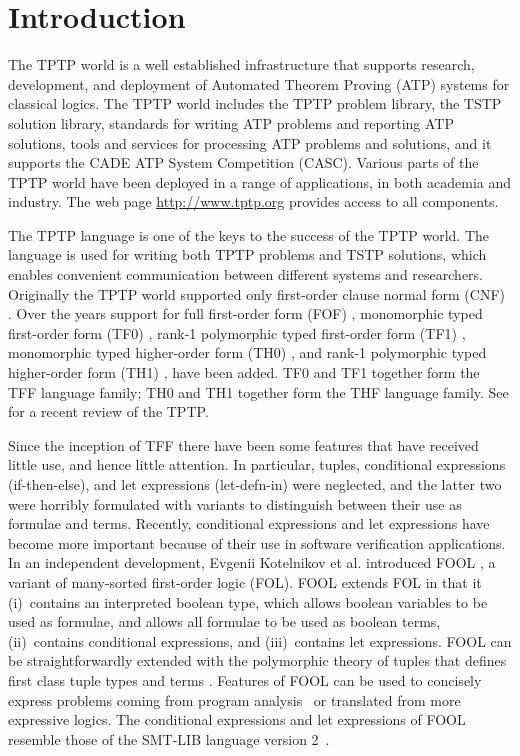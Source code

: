 \section{Introduction}
\label{sec:tfx/Introduction}

The TPTP world \cite{Sut10} is a well established infrastructure that supports
research, development, and deployment of Automated Theorem Proving (ATP)
systems for classical logics.
The TPTP world includes the TPTP problem library,
the TSTP solution library,
standards for writing ATP problems and reporting ATP solutions,
tools and services for processing ATP problems and solutions,
and it supports the CADE ATP System Competition (CASC).
Various parts of the TPTP world have been deployed in a range of applications,
in both academia and industry.
The web page \url{http://www.tptp.org} provides access to all components.

The TPTP language is one of the keys to the success of the TPTP world.
The language is used for writing both TPTP problems and TSTP solutions,
which enables convenient communication between different systems and
researchers.
Originally the TPTP world supported only first-order clause normal form (CNF)
\cite{SS98-JAR}.
Over the years support for full first-order form (FOF) \cite{Sut09},
monomorphic typed first-order form (TF0) \cite{tff0}, rank-1 polymorphic
typed first-order form (TF1) \cite{tff1}, monomorphic typed higher-order 
form (TH0) \cite{THF}, and rank-1 polymorphic typed higher-order form (TH1) 
\cite{KSR16}, have been added.
TF0 and TF1 together form the TFF language family; TH0 and TH1 together form 
the THF language family.
See \cite{Sut17} for a recent review of the TPTP.

Since the inception of TFF there have been some features that have 
received little use, and hence little attention. 
In particular, tuples, conditional expressions (if-then-else), and let 
expressions (let-defn-in) were neglected, and the latter two were horribly 
formulated with variants to distinguish between their use as formulae and 
terms. 
Recently, conditional expressions and let expressions have become more 
important because of their use in software verification applications.
In an independent development, Evgenii Kotelnikov et al. introduced FOOL
\cite{FOOL}, a variant of many-sorted first-order logic (FOL).
FOOL extends FOL in that it (i)~contains an interpreted boolean type, which
allows boolean variables to be used as formulae, and allows all formulae to be 
used as boolean terms, (ii)~contains conditional expressions, and 
(iii)~contains let expressions.
FOOL can be straightforwardly extended with the polymorphic theory of tuples 
that defines first class tuple types and terms \cite{KKV18}.
Features of FOOL can be used to concisely express problems coming from program
analysis~\cite{KKV18} or translated from more expressive logics. 
The conditional expressions and let expressions of FOOL resemble those of the 
SMT-LIB language version 2~\cite{SMT-LIB}.

